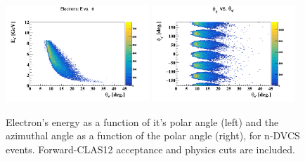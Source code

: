 \begin{figure}[tp]
\centering
   \includegraphics[width=0.48\textwidth,clip,trim=0mm 0mm 0mm 
   20mm]{figs/e_E_theta.png}
\includegraphics[width=0.48\textwidth,clip,trim=0mm 0mm 0mm 
   20mm]{figs/e_phi_theta.png}
   \caption{Electron's energy as a function of it's polar angle (left) and the 
   azimuthal angle as a function of the polar angle (right), for n-DVCS events.  
   Forward-CLAS12 acceptance and physics cuts are included.}
   \label{fig:el_kin}
\end{figure}
 

